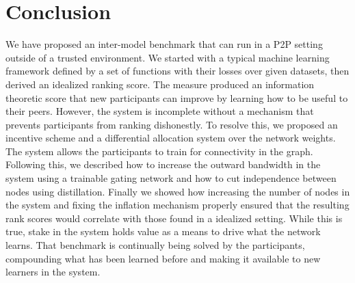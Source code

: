 \documentclass{article}
\begin{document}
\section{Conclusion}
\label{conclusion}
We have proposed an inter-model benchmark that can run in a P2P setting outside of a trusted environment. We started with a typical machine learning framework defined by a set of functions with their losses over given datasets, then derived an idealized ranking score. The measure produced an information theoretic score that new participants can improve by learning how to be useful to their peers. However, the system is incomplete without a mechanism that prevents participants from ranking dishonestly. To resolve this, we proposed an incentive scheme and a differential allocation system over the network weights. The system allows the participants to train for connectivity in the graph. Following this, we described how to increase the outward bandwidth in the system using a trainable gating network and how to cut independence between nodes using distillation. Finally we showed how increasing the number of nodes in the system and fixing the inflation mechanism properly ensured that the resulting rank scores would correlate with those found in a idealized setting. While this is true, stake in the system holds value as a means to drive what the network learns. That benchmark is continually being solved by the participants, compounding what has been learned before and making it available to new learners in the system.

\end{document}
